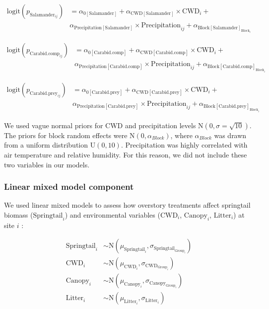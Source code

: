 \begin{align}
  \text{logit}(p_{\text{Salamander}_{ij}}) &= \alpha_{0[\text{Salamander}]} + \alpha_{\text{CWD}[\text{Salamander}]} \times \text{CWD}_i + \nonumber \\
  &\alpha_{\text{Precipitation}[\text{Salamander}]} \times \text{Precipitation}_{ij} + \alpha_{\text{Block}[\text{Salamander}]_{\text{Block}_i}} \nonumber
\end{align}

\begin{align}
  \text{logit}(p_{\text{Carabid.comp}_{ij}}) &= \alpha_{0[\text{Carabid.comp}]} + \alpha_{\text{CWD}[\text{Carabid.comp}]} \times \text{CWD}_i + \\
  &\alpha_{\text{Precipitation}[\text{Carabid.comp}]} \times \text{Precipitation}_{ij} + \alpha_{\text{Block}[\text{Carabid.comp}]_{\text{Block}_i}} \nonumber 
\end{align}

\begin{align}
  \text{logit}(p_{\text{Carabid.prey}_{ij}}) &= \alpha_{0[\text{Carabid.prey}]} + \alpha_{\text{CWD}[\text{Carabid.prey}]} \times \text{CWD}_i + \nonumber \\
  &\alpha_{\text{Precipitation}[\text{Carabid.prey}]} \times \text{Precipitation}_{ij} + \alpha_{\text{Block}[\text{Carabid.prey}]_{\text{Block}_i}} \nonumber 
\end{align}


We used vague normal priors for CWD and precipitation levels $\text{N}(0, \sigma = \sqrt{10})$. 
The priors for block random effects were $\text{N}(0, \alpha_{Block})$, where $\alpha_{Block}$ was drawn from a uniform distribution $\text{U}(0, 10)$. 
Precipitation was highly correlated with air temperature and relative humidity. 
For this reason, we did not include these two variables in our models.


\subsubsection{Linear mixed model component} 

We used linear mixed models to assess how overstory treatments affect springtail biomass ($\text{Springtail}_{i}$) and 
environmental variables ($\text{CWD}_{i}$, $\text{Canopy}_{i}$, $\text{Litter}_{i}$) at site $i$ :

\begin{align}
  \text{Springtail}_{i} &\sim \text{N} (\mu_{\text{Springtail}_i}, \sigma_{\text{Springtail}_{\text{Group}_i}}) \nonumber \\
  \text{CWD}_{i} &\sim \text{N} (\mu_{\text{CWD}_i}, \sigma_{\text{CWD}_{\text{Group}_i}}) \\
  \text{Canopy}_{i} &\sim \text{N} (\mu_{\text{Canopy}_i}, \sigma_{\text{Canopy}_{\text{Group}_i}}) \nonumber \\
  \text{Litter}_{i} &\sim \text{N} (\mu_{\text{Litter}_i}, \sigma_{\text{Litter}_{i}}) \nonumber 
\end{align}

